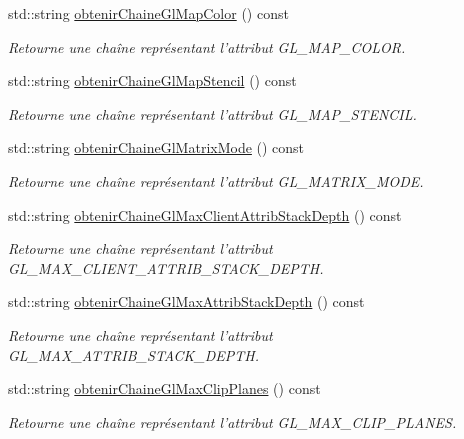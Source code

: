 \begin{DoxyCompactItemize}
std\-::string \hyperlink{group__utilitaire_ga7224b43655a9b3d8a381bea11d42d401}{obtenir\-Chaine\-Gl\-Map\-Color} () const 
\begin{DoxyCompactList}\small\item\em Retourne une chaîne représentant l'attribut G\-L\-\_\-\-M\-A\-P\-\_\-\-C\-O\-L\-O\-R. \end{DoxyCompactList}\item 
std\-::string \hyperlink{group__utilitaire_ga17a6e4887be554b1845d8eb595129b0c}{obtenir\-Chaine\-Gl\-Map\-Stencil} () const 
\begin{DoxyCompactList}\small\item\em Retourne une chaîne représentant l'attribut G\-L\-\_\-\-M\-A\-P\-\_\-\-S\-T\-E\-N\-C\-I\-L. \end{DoxyCompactList}\item 
std\-::string \hyperlink{group__utilitaire_ga3cb5f2ef622bebc2786449eda2460d55}{obtenir\-Chaine\-Gl\-Matrix\-Mode} () const 
\begin{DoxyCompactList}\small\item\em Retourne une chaîne représentant l'attribut G\-L\-\_\-\-M\-A\-T\-R\-I\-X\-\_\-\-M\-O\-D\-E. \end{DoxyCompactList}\item 
std\-::string \hyperlink{group__utilitaire_ga2085416ccd06cb60bc98ba2207174dd1}{obtenir\-Chaine\-Gl\-Max\-Client\-Attrib\-Stack\-Depth} () const 
\begin{DoxyCompactList}\small\item\em Retourne une chaîne représentant l'attribut G\-L\-\_\-\-M\-A\-X\-\_\-\-C\-L\-I\-E\-N\-T\-\_\-\-A\-T\-T\-R\-I\-B\-\_\-\-S\-T\-A\-C\-K\-\_\-\-D\-E\-P\-T\-H. \end{DoxyCompactList}\item 
std\-::string \hyperlink{group__utilitaire_gaa03eca9a37a755a11183714292f89779}{obtenir\-Chaine\-Gl\-Max\-Attrib\-Stack\-Depth} () const 
\begin{DoxyCompactList}\small\item\em Retourne une chaîne représentant l'attribut G\-L\-\_\-\-M\-A\-X\-\_\-\-A\-T\-T\-R\-I\-B\-\_\-\-S\-T\-A\-C\-K\-\_\-\-D\-E\-P\-T\-H. \end{DoxyCompactList}\item 
std\-::string \hyperlink{group__utilitaire_gae90d5285df064d711bedd09091ba413b}{obtenir\-Chaine\-Gl\-Max\-Clip\-Planes} () const 
\begin{DoxyCompactList}\small\item\em Retourne une chaîne représentant l'attribut G\-L\-\_\-\-M\-A\-X\-\_\-\-C\-L\-I\-P\-\_\-\-P\-L\-A\-N\-E\-S. \end{DoxyCompactList}\item 

\end{DoxyCompactItemize}
